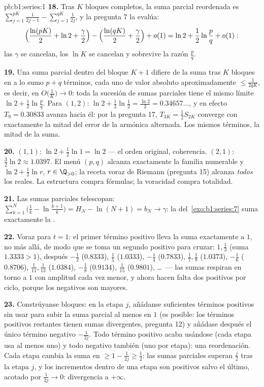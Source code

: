 \begin{solution}{pb:b1:series:1}
\textbf{18.} Tras $K$ bloques completos, la suma parcial reordenada
es $\sum_{j=1}^{pK}\frac{1}{2j-1} - \sum_{j=1}^{qK}\frac{1}{2j}$, y
la pregunta 7 la evalúa:
\[
\Bigl(\frac{\ln(pK)}{2} + \ln 2 + \frac\gamma2\Bigr)
- \Bigl(\frac{\ln(qK)}{2} + \frac\gamma2\Bigr) + o(1)
= \ln 2 + \frac12\ln\frac pq + o(1) :
\]
las $\gamma$ se cancelan, los $\ln K$ se cancelan y sobrevive la
razón $\frac pq$.

\textbf{19.} Una suma parcial dentro del bloque $K + 1$ difiere de la
suma tras $K$ bloques en a lo sumo $p + q$ términos, cada uno de
valor absoluto aproximadamente $\leq \frac{1}{2qK}$, es decir, en
$O\bigl(\frac1K\bigr) \to 0$: toda la sucesión de sumas parciales
tiene el mismo límite $\ln 2 + \frac12\ln\frac pq$. Para $(1, 2)$:
$\ln 2 + \frac12\ln\frac12 = \frac{\ln 2}{2} = 0.34657\dots$, y en
efecto $T_9 = 0.30833$ avanza hacia él: por la pregunta 17,
$T_{3K} = \frac12 S_{2K}$ converge con exactamente la mitad del error
de la armónica alternada. Los mismos términos, la mitad de la suma.

\textbf{20.} $(1,1)$: $\ln 2 + \frac12\ln 1 = \ln 2$ --- el orden
original, coherencia. $(2,1)$: $\frac32\ln 2 \approx 1.0397$. El menú
$(p,q)$ alcanza exactamente la familia numerable y 
$\ln 2 + \frac12\ln r$, $r \in \Q_{>0}$; la receta voraz de Riemann
(pregunta 15) alcanza \emph{todos} los reales. La estructura compra
fórmulas; la voracidad compra totalidad.

\textbf{21.} Las sumas parciales telescopan:
$\sum_{k=1}^{N} \bigl(\frac1k - \ln\frac{k+1}{k}\bigr) =
H_N - \ln(N+1) = b_N \to \gamma$: la  del~\cref{exo:b1:series:7}
suma exactamente la .

\textbf{22.} Voraz para $t = 1$: el primer término positivo lleva la
suma exactamente a $1$, no más allá, de modo que se toma un segundo
positivo para cruzar: $1, \frac13$ (suma $1.3333 > 1$), después
$-\frac12$ ($0.8333$), $\frac15$ ($1.0333$), $-\frac14$
($0.7833$), $\frac17, \frac19$ ($1.0373$), $-\frac16$
($0.8706$), $\frac1{11}, \frac1{13}$ ($1.0384$), $-\frac18$
($0.9134$), $\frac1{15}$ ($0.9801$), \dots\ --- las sumas respiran en
torno a $1$ con amplitud cada vez menor, y ahora hacen falta dos
positivos por ciclo, porque los negativos son mayores.

\textbf{23.} Constrúyanse bloques: en la etapa $j$, añádanse
suficientes términos positivos sin usar para subir la suma parcial al
menos en $1$ (es posible: los términos positivos restantes tienen
sumas divergentes, pregunta 12) y añádase después el único término
negativo $-\frac{1}{2j}$. Todo término positivo acaba usándose (cada
etapa usa al menos uno) y todo negativo también (uno por etapa): una
reordenación. Cada etapa cambia la suma en $\geq 1 - \frac{1}{2j}
\geq \frac12$: las sumas parciales superan $\frac{j}{2}$ tras la
etapa $j$, y los incrementos dentro de una etapa son positivos salvo
el último, acotado por $\frac{1}{2j} \to 0$: divergencia a $+\infty$.


\end{solution}
